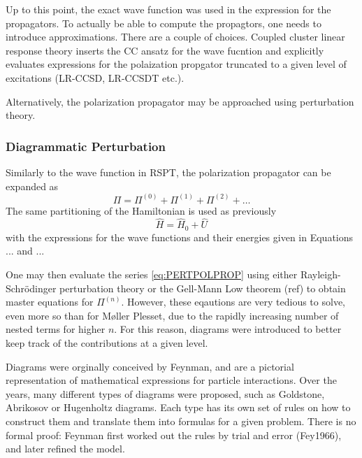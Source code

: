 Up to this point, the exact wave function was used in the expression for the propagators. To actually be able to compute the propagtors, one needs to introduce approximations. There are a couple of choices. Coupled cluster linear response theory inserts the CC ansatz for the wave fucntion and explicitly evaluates expressions for the polaization propgator truncated to a given level of excitations (LR-CCSD, LR-CCSDT etc.).

Alternatively, the polarization propagator may be approached using perturbation theory.

\subsubsection{Diagrammatic Perturbation}

Similarly to the wave function in RSPT, the polarization propagator can be expanded as
\begin{equation}
\Pi = \Pi^{(0)} + \Pi^({1}) + \Pi^{(2)} + \ldots
\label{eq:PERTPOLPROP}
\end{equation}
\noindent The same partitioning of the Hamiltonian is used as previously
\begin{equation}
\hat{H} = \hat{H}_0 + \hat{U}
\end{equation}
\noindent with the expressions for the wave functions and their energies given in Equations ... and ... 

One may then evaluate the series \ref{eq:PERTPOLPROP} using either Rayleigh-Schrödinger perturbation theory or the Gell-Mann Low theorem (ref) to obtain master equations for $\Pi^{(n)}$. However, these eqautions are very tedious to solve, even more so than for M{\o}ller Plesset, due to the rapidly increasing number of nested terms for higher $n$. For this reason, diagrams were introduced to better keep track of the contributions at a given level. 

Diagrams were orginally conceived by Feynman, and are a pictorial representation of mathematical expressions for particle interactions. Over the years, many different types of diagrams were proposed, such as Goldstone, Abrikosov or Hugenholtz diagrams. Each type has its own set of rules on how to construct them and translate them into formulas for a given problem. There is no formal proof: Feynman first worked out the rules by trial and error (Fey1966), and later refined the model.


